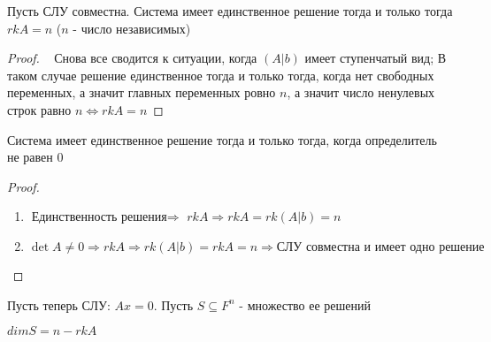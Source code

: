 \begin{theorem}
    
    Пусть СЛУ совместна. Система имеет единственное решение тогда и только тогда $rk A = n$ ($n$ - число независимых)

    \begin{proof}~
        Снова все сводится к ситуации, когда $(A|b)$ имеет ступенчатый вид; В таком случае решение единственное тогда и только тогда, когда нет свободных переменных, а значит главных переменных ровно $n$, а значит число ненулевых строк равно $n \Leftrightarrow rk A = n$
    \end{proof}

\end{theorem}


\begin{lemma}
    
    Система имеет единственное решение тогда и только тогда, когда определитель не равен 0

    \begin{proof}~
        \begin{enumerate}
            \item $\textbf{Единственность решения} \Rightarrow$ $rk A \Rightarrow rk A = rk (A|b) = n$
            \item $\det A \not= 0 \Rightarrow rk A \Rightarrow rk (A|b) = rk A = n \Rightarrow \text{СЛУ совместна и имеет одно решение}$
        \end{enumerate}
    \end{proof}

\end{lemma}


Пусть теперь СЛУ: $Ax = 0$. Пусть $S \subseteq F^n$ - множество ее решений


\begin{lemma}
    
    $dim S = n - rk A$

\end{lemma}